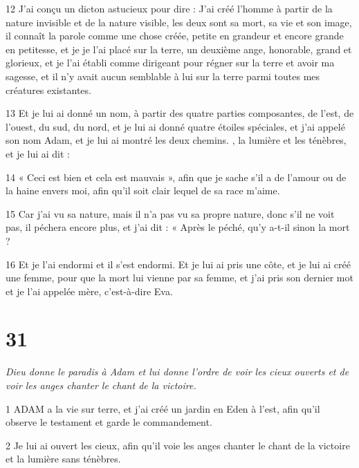 \par 12 J'ai conçu un dicton astucieux pour dire : J'ai créé l'homme à partir de la nature invisible et de la nature visible, les deux sont sa mort, sa vie et son image, il connaît la parole comme une chose créée, petite en grandeur et encore grande en petitesse, et je je l'ai placé sur la terre, un deuxième ange, honorable, grand et glorieux, et je l'ai établi comme dirigeant pour régner sur la terre et avoir ma sagesse, et il n'y avait aucun semblable à lui sur la terre parmi toutes mes créatures existantes.

\par 13 Et je lui ai donné un nom, à partir des quatre parties composantes, de l'est, de l'ouest, du sud, du nord, et je lui ai donné quatre étoiles spéciales, et j'ai appelé son nom Adam, et je lui ai montré les deux chemins. , la lumière et les ténèbres, et je lui ai dit :

\par 14 « Ceci est bien et cela est mauvais », afin que je sache s'il a de l'amour ou de la haine envers moi, afin qu'il soit clair lequel de sa race m'aime.

\par 15 Car j'ai vu sa nature, mais il n'a pas vu sa propre nature, donc s'il ne voit pas, il péchera encore plus, et j'ai dit : « Après le péché, qu'y a-t-il sinon la mort ?

\par 16 Et je l'ai endormi et il s'est endormi. Et je lui ai pris une côte, et je lui ai créé une femme, pour que la mort lui vienne par sa femme, et j'ai pris son dernier mot et je l'ai appelée mère, c'est-à-dire Eva.

\chapter{31}

\par \textit{Dieu donne le paradis à Adam et lui donne l'ordre de voir les cieux ouverts et de voir les anges chanter le chant de la victoire.}

\par 1 ADAM a la vie sur terre, et j'ai créé un jardin en Eden à l'est, afin qu'il observe le testament et garde le commandement.

\par 2 Je lui ai ouvert les cieux, afin qu'il voie les anges chanter le chant de la victoire et la lumière sans ténèbres.

